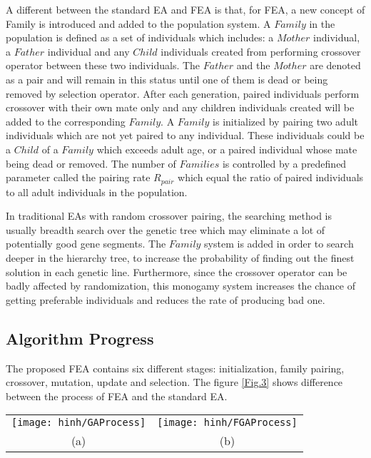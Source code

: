 \documentclass[final]{elsarticle}
\begin{document}
A different between the standard EA and FEA is that, for FEA, a new concept of Family is introduced and added to the population system. A $ Family $ in the population is defined as a set of individuals which includes: a $ Mother $ individual, a $ Father $ individual and any $ Child $ individuals created from performing crossover operator between these two individuals. The $ Father $ and the $ Mother $ are denoted as a pair and will remain in this status until one of them is dead or being removed by selection operator. After each generation, paired individuals perform crossover with their own mate only and any children individuals created will be added to the corresponding $ Family $. A $ Family $ is initialized by pairing two adult individuals which are not yet paired to any individual. These individuals could be a $ Child $ of a $ Family $ which exceeds adult age, or a paired individual whose mate being dead or removed. The number of $ Families $ is controlled by a predefined parameter called the pairing rate $R_{pair}$ which equal the ratio of paired individuals to all adult individuals in the population.

In traditional EAs with random crossover pairing, the searching method is usually breadth search over the genetic tree which may eliminate a lot of potentially good gene segments. The $ Family $ system is added in order to search deeper in the hierarchy tree, to increase the probability of finding out the finest solution in each genetic line. Furthermore, since the crossover operator can be badly affected by randomization, this monogamy system increases the chance of getting preferable individuals and reduces the rate of producing bad one. 


\subsection{Algorithm Progress}

The proposed FEA contains six different stages: initialization, family pairing, crossover, mutation, update and selection. The figure \ref{Fig.3} shows difference between the process of FEA and the standard EA.
\begin{figure*}[h]
	\begin{tabular}{cc}
		\texttt{[image: hinh/GAProcess]}&\texttt{[image: hinh/FGAProcess]}\\
		(a)  &(b) \\
	\end{tabular}
	\centering
	\caption{The algorithm process of EA (a) and FEA (b)
	}
	\label{Fig.3}       %
\end{figure*}
\end{document}
